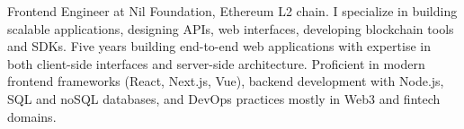 

\begin{cvparagraph}

Frontend Engineer at Nil Foundation, Ethereum L2 chain.
I specialize in building scalable applications, designing APIs, web interfaces, developing blockchain tools and SDKs.
\newline
Five years building end-to-end web applications with expertise in both client-side interfaces and server-side architecture.
\newline
Proficient in modern frontend frameworks (React, Next.js, Vue), backend development with Node.js, SQL and noSQL databases, and DevOps practices
mostly in Web3 and fintech domains.
\end{cvparagraph}
